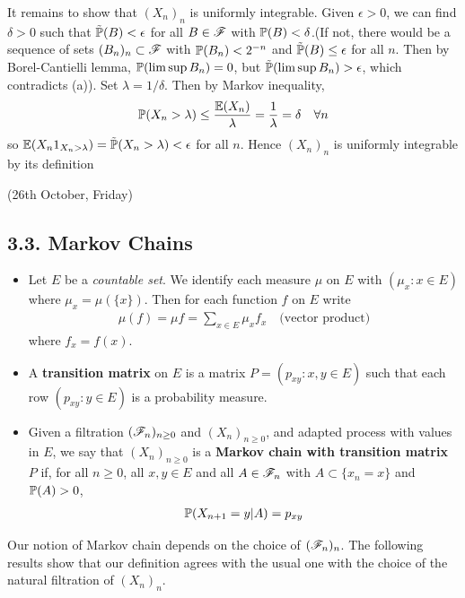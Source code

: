 \documentclass[10pt,a4paper]{report}
\newenvironment{proof}
{\begin{changemargin}{1cm}{0.5cm} 
	}%
	{\end{changemargin}
}
\begin{document}
\begin{proof}
\quad It remains to show that $(X_n)_n$ is uniformly integrable. Given $\epsilon >0$, we can find $\delta >0$ such that $\tilde{\mathbb{P}}(B) <\epsilon$ for all $B \in \mathscr{F}$ with $\mathbb{P} (B) <\delta$.(If not, there would be a sequence of sets $(B_n)_{n} \subset \mathscr{F}$ with $\mathbb{P}(B_n)<2^{-n}$ and $\tilde{\mathbb{P}}(B) \leq \epsilon$ for all $n$. Then by Borel-Cantielli lemma, $\mathbb{P}(\limsup B_n) =0$, but $\tilde{\mathbb{P}}(\limsup B_n) >\epsilon$, which contradicts (a)). Set $\lambda = 1/\delta$. Then by Markov inequality,
\begin{align*}
\mathbb{P}(X_n > \lambda) \leq \frac{\mathbb{E}(X_n)}{\lambda} = \frac{1}{\lambda} = \delta \quad \forall n
\end{align*}
so $\mathbb{E}(X_n 1_{X_n > \lambda}) = \tilde{\mathbb{P}}(X_n > \lambda) < \epsilon$ for all $n$. Hence $(X_n)_n$ is uniformly integrable by its definition

\eop
\end{proof}
\s

\newday

(26th October, Friday)
\s

\subsection*{3.3. Markov Chains}

\begin{itemize}
\item Let $E$ be a \emph{countable set}. We identify each measure $\mu$ on $E$ with $(\mu_x : x\in E)$ where $\mu_x = \mu(\{x\})$. Then for each function $f$ on $E$ write
\begin{align*}
\mu(f) = \mu f = \sum_{x\in E} \mu_x f_x \quad \text{(vector product)}
\end{align*}
where $f_x = f(x)$.
\item A \textbf{transition matrix} on $E$ is a matrix $P=(p_{xy}:x,y\in E)$ such that each row $(p_{xy}:y\in E)$ is a probability measure.
\item Given a filtration $(\mathscr{F}_n)_{n\geq 0}$ and $(X_n)_{n\geq 0}$, and adapted process with values in $E$, we say that $(X_n)_{n\geq 0}$ is a \textbf{Markov chain with transition matrix $P$} if, for all $n\geq 0$, all $x,y\in E$ and all $A\in \mathscr{F}_n$ with $A\subset \{x_n =x \}$ and $\mathbb{P}(A)>0$,
\begin{align*}
\mathbb{P}(X_{n+1} =y |A) = p_{xy}
\end{align*}
\end{itemize}
Our notion of Markov chain depends on the choice of $(\mathscr{F}_n)_n$. The following results show that our definition agrees with the usual one with the choice of the natural filtration of $(X_n)_n$.
\s
\end{document}
